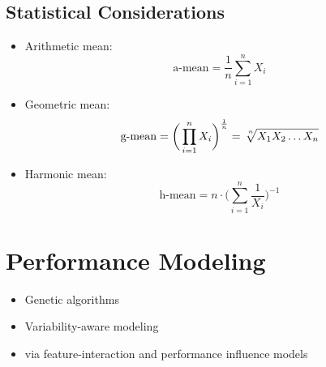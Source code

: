 \subsection{Statistical Considerations}

\begin{itemize}
  \item Arithmetic mean: $$\text{a-mean} = \frac{1}{n}\sum_{i=1}^{n} X_i$$
  \item Geometric mean: $$\text{g-mean} = \bigg(\prod_{i=1}^{n}
  X_i\bigg)^\frac{1}{n} = \sqrt[\leftroot{-2}\uproot{2}n]{X_1 X_2 \ldots X_n}$$
  \item Harmonic mean: $$\text{h-mean} = n \cdot \bigg(\sum_{i=1}^{n}
  \frac{1}{X_i}\bigg)^{-1}$$
\end{itemize}

\section{Performance Modeling} \label{sec:2.4}
\begin{itemize}
  \item Genetic algorithms \citep{guo_genetic_2011}
  \item Variability-aware modeling \citep{guo_variability-aware_2013}
  \item via feature-interaction and performance influence models
  \citep{siegmund_predicting_2012,siegmund_performance-influence_2015}
\end{itemize}